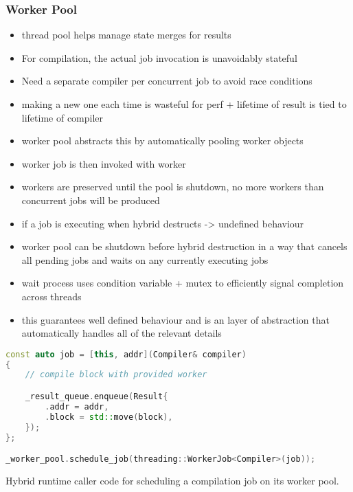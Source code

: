 \subsubsection{Worker Pool}


\begin{itemize}
    \item thread pool helps manage state merges for results
    \item For compilation, the actual job invocation is unavoidably stateful
    \item Need a separate compiler per concurrent job to avoid race conditions
    \item making a new one each time is wasteful for perf + lifetime of result is tied to lifetime of compiler
    \item worker pool abstracts this by automatically pooling worker objects
    \item worker job is then invoked with worker
    \item workers are preserved until the pool is shutdown, no more workers than concurrent jobs will be produced
    \item if a job is executing when hybrid destructs -> undefined behaviour
    \item worker pool can be shutdown before hybrid destruction in a way that cancels all pending jobs and waits on any currently executing jobs
    \item wait process uses condition variable + mutex to efficiently signal completion across threads
    \item this guarantees well defined behaviour and is an layer of abstraction that automatically handles all of the relevant details
\end{itemize}



\begin{lstfloat}[H]
    \begin{lstlisting}[language=c++]
const auto job = [this, addr](Compiler& compiler)
{
    // compile block with provided worker

    _result_queue.enqueue(Result{
        .addr = addr,
        .block = std::move(block),
    });
};

_worker_pool.schedule_job(threading::WorkerJob<Compiler>(job));
    \end{lstlisting}
    \caption{Hybrid runtime caller code for scheduling a compilation job on its worker pool.}
    \label{code:schedule-job-worker}
\end{lstfloat}